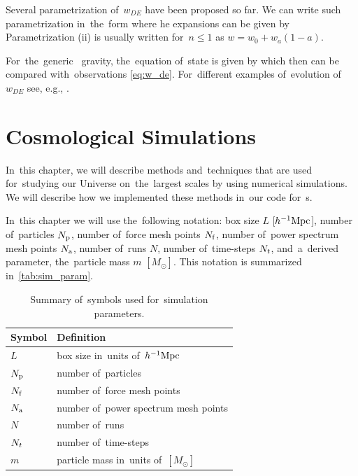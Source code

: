 Several parametrization  of~\(w_{DE}\) have been proposed so far. We can write such parametrization  in~the~form
where he expansions can be given by
Parametrization (ii) is usually written for~\(n\leq1\) as \(w=w_0+w_a(1-a)\).

For~the~generic \fR\ gravity, the~equation of~state is given by \parencite{2013qopu.conf...73B}
which then can be compared with~observations \eqref{eq:w_de}. For~different examples of~evolution of~$w_{DE}$ see, e.g., \textcite{2020arXiv200707717A}. \clearpage{}
\clearpage{}\chapter{Cosmological Simulations}
\label{chpt:cosmo_sim}
In~this chapter, we will describe methods and~techniques that are used for~studying our Universe on~the~largest scales by using numerical simulations. We will describe how we implemented these methods in~our code for~\nbodysim s.

In~this chapter we will use the~following notation: box size $L$ [$h^{-1}\text{Mpc}$], number of~particles $N_{\rm p}$, number of~force mesh points $N_{\rm f}$, number of~power spectrum mesh points $N_{\rm a}$, number of~runs $N$, number of~time-steps $N_t$, and~a~derived parameter, the~particle mass $m$ $[M_\odot]$. This notation is summarized in~\autoref{tab:sim_param}.

\begin{table}
\centering
\begin{tabular}{ll}
    \hline \hline
    Symbol & Definition \\
    \hline
    $L$ & box size in~units of~$h^{-1}\text{Mpc}$ \\
    $N_{\rm p}$ & number of~particles \\
    $N_{\rm f}$ & number of~force mesh points \\
    $N_{\rm a}$ & number of~power spectrum mesh points \\
    $N$ & number of~runs \\
    $N_t$ & number of~time-steps \\
    $m$ & particle mass in~units of~$[M_\odot]$ \\
    \hline \hline
\end{tabular}
\caption{Summary of~symbols used for~simulation parameters.}
\label{tab:sim_param}
\end{table}


